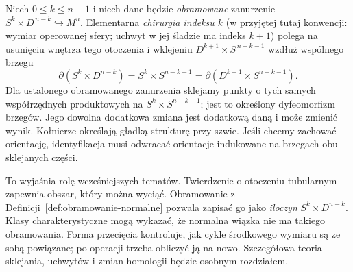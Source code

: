 \begin{definicja}
\label{def:chirurgia-zarys-16}
Niech $0\leq k\leq n-1$
i niech dane będzie
\emph{obramowane}
zanurzenie
$S^k\times D^{\,n-k}
\hookrightarrow M^n$.
Elementarna
\emph{chirurgia indeksu $k$} (w przyjętej tutaj
konwencji: wymiar operowanej sfery; uchwyt w jej
śladzie ma indeks $k+1$) polega na usunięciu
wnętrza tego
otoczenia i
wklejeniu
$D^{k+1}\times
S^{\,n-k-1}$
wzdłuż wspólnego brzegu
\[
 \partial(S^k\times D^{n-k})
 =S^k\times S^{n-k-1}
 =\partial(D^{k+1}\times S^{n-k-1}).
\]
Dla ustalonego obramowanego zanurzenia sklejamy
punkty o tych samych współrzędnych produktowych na
$S^k\times S^{n-k-1}$; jest to określony dyfeomorfizm
brzegów. Jego dowolna dodatkowa zmiana jest dodatkową
daną i może zmienić wynik. Kołnierze określają gładką
strukturę przy szwie. Jeśli chcemy zachować orientację,
identyfikacja musi odwracać orientacje indukowane
na brzegach obu sklejanych części.
\end{definicja}

To wyjaśnia rolę
wcześniejszych tematów.
Twierdzenie o otoczeniu
tubularnym zapewnia
obszar, który można
wyciąć. Obramowanie
z Definicji~\ref{def:obramowanie-normalne}
pozwala zapisać go
jako \emph{iloczyn}
$S^k\times D^{n-k}$.
Klasy charakterystyczne
mogą wykazać, że
normalna wiązka
nie ma takiego
obramowania.
Forma przecięcia
kontroluje, jak
cykle środkowego
wymiaru są ze sobą
powiązane; po
operacji trzeba
obliczyć ją na nowo.
Szczegółowa teoria
sklejania, uchwytów
i zmian homologii
będzie osobnym
rozdziałem.

